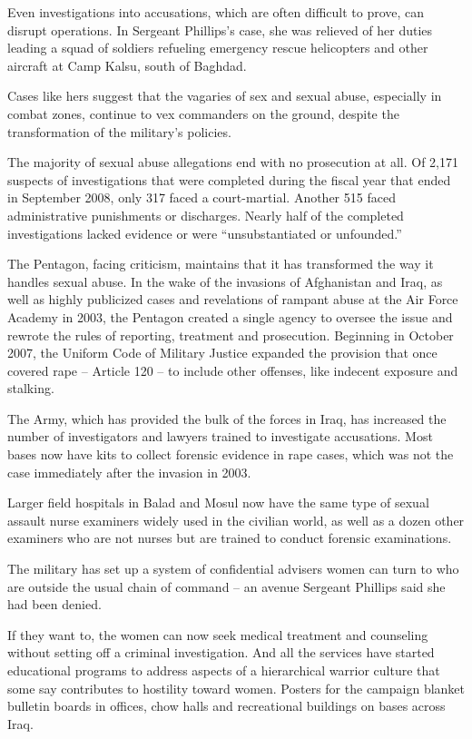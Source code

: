 ﻿\documentclass[12pt]{article}
\begin{document}
Even investigations into accusations, which are often difficult to prove, can disrupt operations. In
Sergeant Phillips's case, she was relieved of her duties leading a squad of soldiers refueling
emergency rescue helicopters and other aircraft at Camp Kalsu, south of Baghdad.

Cases like hers suggest that the vagaries of sex and sexual abuse, especially in combat zones,
continue to vex commanders on the ground, despite the transformation of the military's policies.

The majority of sexual abuse allegations end with no prosecution at all. Of 2,171 suspects of
investigations that were completed during the fiscal year that ended in September 2008, only 317
faced a court-martial. Another 515 faced administrative punishments or discharges. Nearly half of
the completed investigations lacked evidence or were ``unsubstantiated or unfounded.''

The Pentagon, facing criticism, maintains that it has transformed the way it handles sexual abuse.
In the wake of the invasions of Afghanistan and Iraq, as well as highly publicized cases and
revelations of rampant abuse at the Air Force Academy in 2003, the Pentagon created a single agency
to oversee the issue and rewrote the rules of reporting, treatment and prosecution. Beginning in
October 2007, the Uniform Code of Military Justice expanded the provision that once covered rape --
Article 120 -- to include other offenses, like indecent exposure and stalking.

The Army, which has provided the bulk of the forces in Iraq, has increased the number of
investigators and lawyers trained to investigate accusations. Most bases now have kits to collect
forensic evidence in rape cases, which was not the case immediately after the invasion in 2003.

Larger field hospitals in Balad and Mosul now have the same type of sexual assault nurse examiners
widely used in the civilian world, as well as a dozen other examiners who are not nurses but are
trained to conduct forensic examinations.

The military has set up a system of confidential advisers women can turn to who are outside the
usual chain of command -- an avenue Sergeant Phillips said she had been denied.

If they want to, the women can now seek medical treatment and counseling without setting off a
criminal investigation. And all the services have started educational programs to address aspects of
a hierarchical warrior culture that some say contributes to hostility toward women. Posters for the
campaign blanket bulletin boards in offices, chow halls and recreational buildings on bases across
Iraq.
\end{document}
